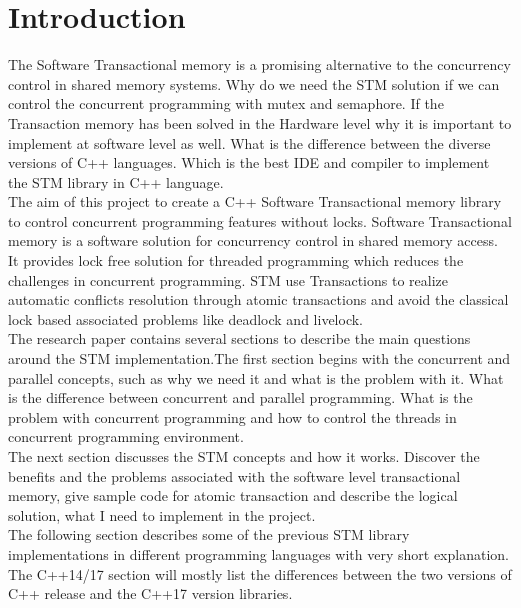 \documentclass[12pt]{article}
\begin{document}
\section{Introduction}
The Software Transactional memory is a promising alternative to the concurrency control in shared memory systems. Why do we need the STM solution if we can control the concurrent programming with mutex and semaphore. If the Transaction memory has been solved in the Hardware level why it is important to implement at software level as well. What is the difference between the diverse versions of C++ languages. Which is the best IDE and compiler to implement the STM library in C++ language.\\

The aim of this project to create a C++ Software Transactional memory library to control concurrent programming features without locks. Software Transactional memory is a software solution for concurrency control in shared memory access. It provides lock free solution for threaded programming which reduces the challenges in concurrent programming. STM use Transactions to realize automatic conflicts resolution through atomic transactions and avoid the classical lock based associated problems like deadlock and livelock.\\

The research paper contains several sections to describe the main questions around the STM implementation.The first section begins with the concurrent and parallel concepts, such as why we need it and what is the problem with it. What is the difference between concurrent and parallel programming. What is the problem with concurrent programming and how to control the threads in concurrent programming environment.\\

The next section discusses the STM concepts and how it works. Discover the benefits and the problems associated with the software level transactional memory, give sample code for atomic transaction and describe the logical solution, what I need to implement in the project.\\

The following section describes some of the previous STM library implementations in different programming languages with very short explanation.\\

The C++14/17 section will mostly list the differences between the two versions of C++ release and the C++17 version libraries.\\
\end{document}
